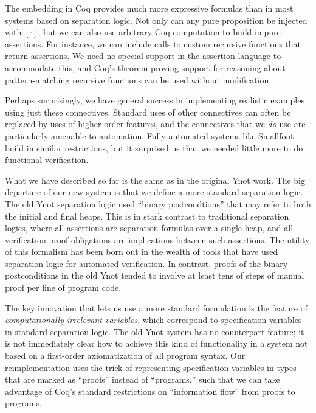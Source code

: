 \documentclass[preprint,nocopyrightspace]{sigplanconf}
\begin{document}
The embedding in Coq provides much more expressive formulas than in most systems based on separation logic.  Not only can any pure proposition be injected with $[\cdot]$, but we can also use arbitrary Coq computation to build impure assertions.  For instance, we can include calls to custom recursive functions that return assertions.  We need no special support in the assertion language to accommodate this, and Coq's theorem-proving support for reasoning about pattern-matching recursive functions can be used without modification.

Perhaps surprisingly, we have general success in implementing realistic examples using just these connectives.  Standard uses of other connectives can often be replaced by uses of higher-order features, and the connectives that we \emph{do} use are particularly amenable to automation.  Fully-automated systems like Smallfoot build in similar restrictions, but it surprised us that we needed little more to do functional verification.

\medskip

What we have described so far is the same as in the original Ynot
work.  The big departure of our new system is that we define a more
standard separation logic.  The old Ynot separation logic used
``binary postcondtions'' that may refer to both the initial and final
heaps.  This is in stark contrast to traditional separation logics,
where all assertions are separation formulas over a single heap, and
all verification proof obligations are implications between such
assertions.  The utility of this formalism has been born out in the
wealth of tools that have used separation logic for automated
verification.  In contrast, proofs of the binary postconditions in the
old Ynot tended to involve at least tens of steps of manual proof per
line of program code.

The key innovation that lets us use a more standard formulation is the feature of \emph{computationally-irrelevant variables}, which correspond to specification variables in standard separation logic.  The old Ynot system has no counterpart feature; it is not immediately clear how to achieve this kind of functionality in a system not based on a first-order axiomatization of all program syntax.  Our reimplementation uses the trick of representing specification variables in types that are marked as ``proofs'' instead of ``programs,'' such that we can take advantage of Coq's standard restrictions on ``information flow'' from proofs to programs.
\end{document}
